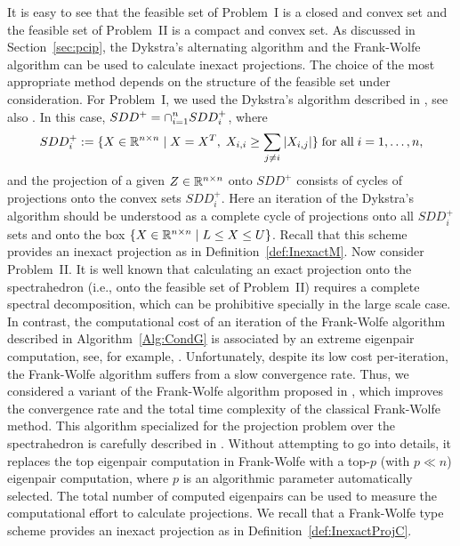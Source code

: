 It is easy to see that the feasible set of Problem~I is a closed and convex set and the feasible set of Problem~II is  a compact and convex set.
As discussed in Section~\ref{sec:pcip}, the Dykstra's alternating algorithm and the Frank-Wolfe algorithm can be used to calculate inexact projections. The choice of the most appropriate method depends on the structure of the feasible set under consideration.
For Problem~I, we used the Dykstra's algorithm described in \cite{BirginMartinezRaydan2003}, see also \cite{dykstraSDD}. In this case, $SDD^+=\displaystyle\cap_{i=1}^n SDD^+_i$, where
$$SDD^+_i :=\{X\in\mathbb{R}^{n\times n}\mid X=X^T, \; X_{i,i}\geq \displaystyle\sum_{j\neq i}|X_{i,j}| \} \; \mbox{for all} \; i=1,\ldots,n,$$
and the projection of a given $Z\in\mathbb{R}^{n\times n}$ onto $SDD^+$ consists of cycles of projections onto the convex sets $SDD^+_i$.
Here an iteration of the Dykstra's algorithm should be understood as a complete cycle of projections onto all $SDD^+_i $ sets and onto the box $\{X\in\mathbb{R}^{n\times n}\mid L\leq X\leq U\}$.
Recall that this scheme provides an inexact projection as in Definition~\ref{def:InexactM}.
%
Now consider Problem~II. It is well known that calculating an exact projection onto the spectrahedron (i.e., onto the feasible set of Problem~II) requires a complete spectral decomposition, which can be prohibitive specially in the large scale case. In contrast, the computational cost of an iteration of the Frank-Wolfe algorithm described in Algorithm~\ref{Alg:CondG} is associated by an extreme eigenpair computation, see, for example, \cite{Jaggi2013}. Unfortunately, despite its low cost per-iteration, the Frank-Wolfe algorithm suffers from a slow convergence rate.
Thus, we considered a variant of the Frank-Wolfe algorithm proposed in \cite{allen2017linear}, which improves the convergence rate and the total time complexity of the classical Frank-Wolfe method. This algorithm specialized for the projection problem over the spectrahedron is carefully described in \cite{aguiar2021inexact}.
Without attempting to go into details, it replaces the top eigenpair computation in Frank-Wolfe with a top-$p$ (with $p\ll n$) eigenpair computation, where $p$ is an algorithmic parameter automatically selected.
The total number of computed eigenpairs can be used to measure the computational effort to calculate projections.
We recall that a Frank-Wolfe type scheme provides an inexact projection as in Definition~\ref{def:InexactProjC}.


